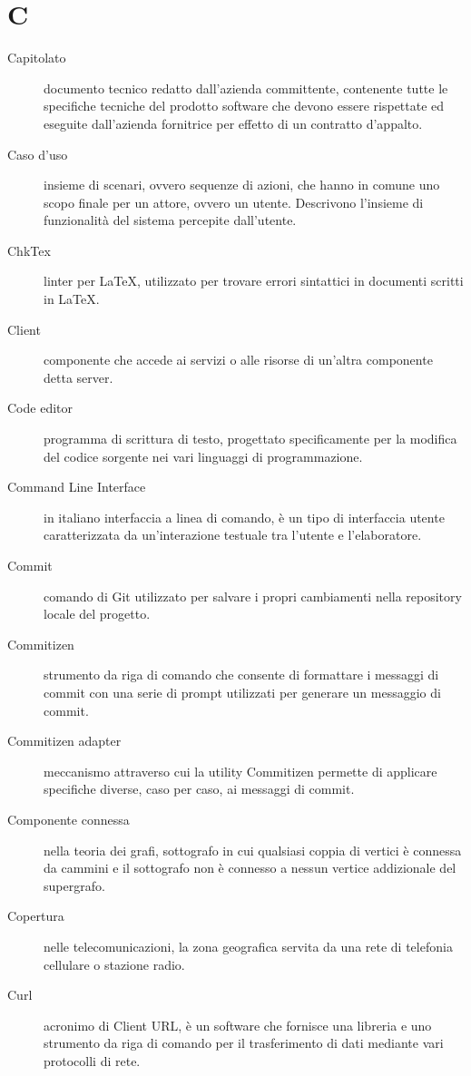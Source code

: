 \documentclass{article}
\begin{document}
\section{C}
\begin{description}
  \item[Capitolato] documento tecnico redatto dall'azienda committente, contenente tutte le specifiche tecniche del prodotto software che devono essere rispettate ed eseguite dall'azienda fornitrice per effetto di un contratto d'appalto.
  \item[Caso d'uso] insieme di scenari, ovvero sequenze di azioni, che hanno in comune uno scopo finale per un attore, ovvero un utente. Descrivono l'insieme di funzionalità del sistema percepite dall'utente.
  \item[ChkTex] linter per LaTeX, utilizzato per trovare errori sintattici in documenti scritti in LaTeX.
  \item[Client] componente che accede ai servizi o alle risorse di un'altra componente detta server.
  \item[Code editor] programma di scrittura di testo, progettato specificamente per la modifica del codice sorgente nei vari linguaggi di programmazione.
  \item[Command Line Interface] in italiano interfaccia a linea di comando, è un tipo di interfaccia utente caratterizzata da un'interazione testuale tra l'utente e l'elaboratore.
  \item[Commit] comando di Git utilizzato per salvare i propri cambiamenti nella repository locale del progetto.
  \item[Commitizen] strumento da riga di comando che consente di formattare i messaggi di commit con una serie di prompt utilizzati per generare un messaggio di commit.
  \item[Commitizen adapter] meccanismo attraverso cui la utility Commitizen permette di applicare specifiche diverse, caso per caso, ai messaggi di commit.
  \item[Componente connessa] nella teoria dei grafi, sottografo in cui qualsiasi coppia di vertici è connessa da cammini e il sottografo non è connesso a nessun vertice addizionale del supergrafo.
  \item[Copertura] nelle telecomunicazioni, la zona geografica servita da una rete di telefonia cellulare o stazione radio.
  \item[Curl] acronimo di Client URL, è un software che fornisce una libreria e uno strumento da riga di comando per il trasferimento di dati mediante vari protocolli di rete.
\end{description}
\newpage
\end{document}
